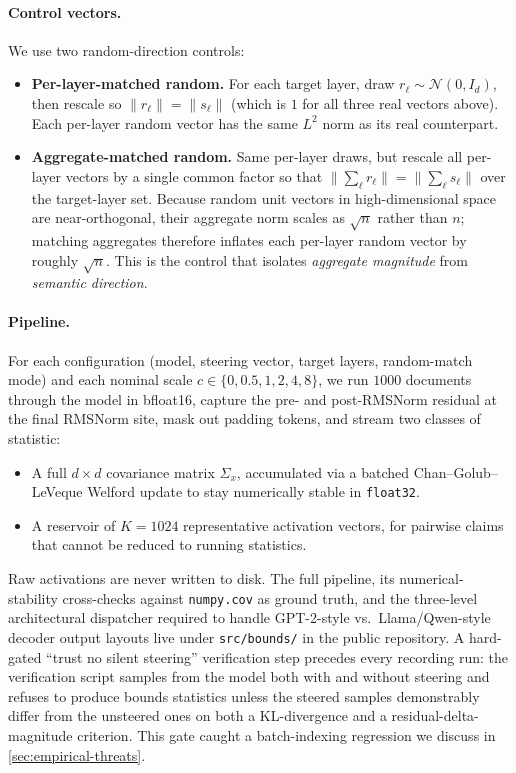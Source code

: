 \paragraph{Control vectors.} We use two random-direction controls:
\begin{itemize}
  \item \textbf{Per-layer-matched random.} For each target layer, draw $r_\ell \sim \mathcal{N}(0, I_d)$, then rescale so $\|r_\ell\| = \|s_\ell\|$ (which is $1$ for all three real vectors above). Each per-layer random vector has the same $L^2$ norm as its real counterpart.
  \item \textbf{Aggregate-matched random.} Same per-layer draws, but rescale all per-layer vectors by a single common factor so that $\|\sum_\ell r_\ell\| = \|\sum_\ell s_\ell\|$ over the target-layer set. Because random unit vectors in high-dimensional space are near-orthogonal, their aggregate norm scales as $\sqrt{n}$ rather than $n$; matching aggregates therefore inflates each per-layer random vector by roughly $\sqrt{n}$. This is the control that isolates \emph{aggregate magnitude} from \emph{semantic direction}.
\end{itemize}

\paragraph{Pipeline.} For each configuration (model, steering vector, target layers, random-match mode) and each nominal scale $c \in \{0, 0.5, 1, 2, 4, 8\}$, we run $1000$ documents through the model in bfloat16, capture the pre- and post-RMSNorm residual at the final RMSNorm site, mask out padding tokens, and stream two classes of statistic:
\begin{itemize}
  \item A full $d\times d$ covariance matrix $\Sigma_x$, accumulated via a batched Chan--Golub--LeVeque Welford update to stay numerically stable in \texttt{float32}.
  \item A reservoir of $K = 1024$ representative activation vectors, for pairwise claims that cannot be reduced to running statistics.
\end{itemize}
Raw activations are never written to disk. The full pipeline, its numerical-stability cross-checks against \texttt{numpy.cov} as ground truth, and the three-level architectural dispatcher required to handle GPT-2-style vs.\ Llama/Qwen-style decoder output layouts live under \texttt{src/bounds/} in the public repository. A hard-gated ``trust no silent steering'' verification step precedes every recording run: the verification script samples from the model both with and without steering and refuses to produce bounds statistics unless the steered samples demonstrably differ from the unsteered ones on both a KL-divergence and a residual-delta-magnitude criterion. This gate caught a batch-indexing regression we discuss in \ref{sec:empirical-threats}.

